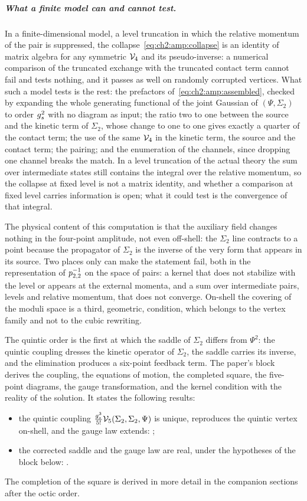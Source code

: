 \subparagraph{What a finite model can and cannot test.}
In a finite-dimensional model, a level truncation in which the relative momentum of the pair is suppressed, the collapse~\eqref{eq:ch2:amp:collapse} is an identity of matrix algebra for any symmetric $\mathcal{V}_{4}$ and its pseudo-inverse: a numerical comparison of the truncated exchange with the truncated contact term cannot fail and tests nothing, and it passes as well on randomly corrupted vertices.
What such a model tests is the rest: the prefactors of~\eqref{eq:ch2:amp:assembled}, checked by expanding the whole generating functional of the joint Gaussian of $(\Psi, \Sigma_2)$ to order $g_s^2$ with no diagram as input; the ratio two to one between the source and the kinetic term of $\Sigma_2$, whose change to one to one gives exactly a quarter of the contact term; the use of the same $\mathcal{V}_{4}$ in the kinetic term, the source and the contact term; the pairing; and the enumeration of the channels, since dropping one channel breaks the match.
In a level truncation of the actual theory the sum over intermediate states still contains the integral over the relative momentum, so the collapse at fixed level is not a matrix identity, and whether a comparison at fixed level carries information is open; what it could test is the convergence of that integral.

The physical content of this computation is that the auxiliary field changes nothing in the four-point amplitude, not even off-shell: the $\Sigma_2$ line contracts to a point because the propagator of $\Sigma_2$ is the inverse of the very form that appears in its source.
Two places only can make the statement fail, both in the representation of $p_{2,2}^{-1}$ on the space of pairs: a kernel that does not stabilize with the level or appears at the external momenta, and a sum over intermediate pairs, levels and relative momentum, that does not converge.
On-shell the covering of the moduli space is a third, geometric, condition, which belongs to the vertex family and not to the cubic rewriting.

\medskip

The quintic order is the first at which the saddle of $\Sigma_2$ differs from $\Psi^2$: the quintic coupling dresses the kinetic operator of $\Sigma_2$, the saddle carries its inverse, and the elimination produces a six-point feedback term.
The paper's block derives the coupling, the equations of motion, the completed square, the five-point diagrams, the gauge transformation, and the kernel condition with the reality of the solution.
It states the following results:
\begin{itemize}
  \item the quintic coupling $\tfrac{g_s^3}{5!} \mathcal{V}_{5}(\Sigma_2, \Sigma_2, \Psi)$ is unique, reproduces the quintic vertex on-shell, and the gauge law extends: ;
  \item the corrected saddle and the gauge law are real, under the hypotheses of the block below: .
\end{itemize}
The completion of the square is derived in more detail in the companion sections after the octic order.


